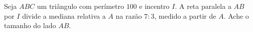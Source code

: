 Seja $ABC$ um triângulo com perímetro $100$ e incentro $I$. A reta paralela a $AB$ por $I$ divide a mediana relativa a $A$ na razão $7:3$, medido a partir de $A$. Ache o tamanho do lado $AB$.
